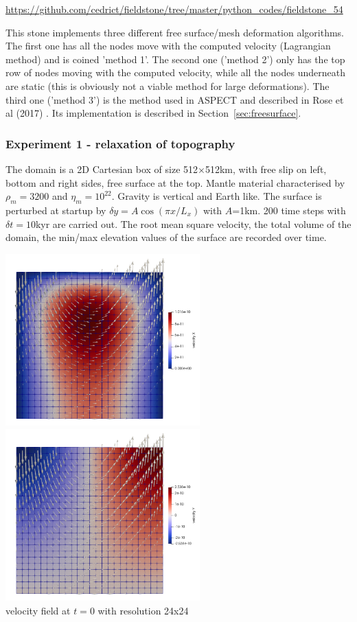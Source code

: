 \url{https://github.com/cedrict/fieldstone/tree/master/python_codes/fieldstone_54}

\vspace{1cm}

This stone implements three different free surface/mesh deformation algorithms. 
The first one has all the nodes move with the computed velocity (Lagrangian method)
and is coined 'method 1'. 
The second one ('method 2') only has the top row of nodes moving with the computed velocity, 
while all the nodes underneath are static (this is obviously not a viable method for 
large deformations). 
The third one ('method 3') is the method used in ASPECT and described in Rose et al (2017) \cite{robh17}.
Its implementation is described in Section~\ref{sec:freesurface}.

\subsubsection*{Experiment 1 - relaxation of topography}

The domain is a 2D Cartesian box of size 512$\times$512km, with free slip on left, 
bottom and right sides, free surface at the top. 
Mantle material characterised by $\rho_m=3200$ and $\eta_m=10^{22}$. 
Gravity is vertical and Earth like. 
The surface is perturbed at startup by $\delta y = A \cos (\pi x /L_x)$ with $A$=1km.
200 time steps with $\delta t=10$kyr are carried out.
The root mean square velocity, the total volume of the domain, the min/max elevation
values of the surface are recorded over time. 

\begin{center}
\includegraphics[width=7.5cm]{python_codes/fieldstone_54/images/exp1/u}
\includegraphics[width=7.5cm]{python_codes/fieldstone_54/images/exp1/v}\\
{\scriptsize velocity field at $t=0$ with resolution 24x24}
\end{center}

